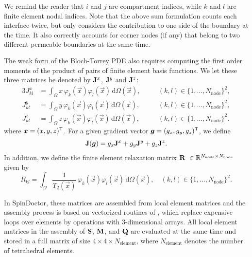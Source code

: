 \documentclass[a4paper]{article}
\begin{document}
We remind the reader that $i$ and $j$ are compartment indices, while $k$ and $l$ are finite element nodal indices. Note that the above sum formulation counts each interface twice, but only considers the contribution to one side of the boundary at the time. It also correctly accounts for corner nodes (if any) that belong to two different permeable boundaries at the same time.

The weak form of the Bloch-Torrey PDE also requires computing the first order moments of the product of pairs of finite element basis functions. We let these three matrices be denoted by $\mathbf{J}^x$, $\mathbf{J}^y$ and $\mathbf{J}^z$:
\begin{alignat}{3}
    J_{kl}^x & = \int_\Omega x \, \varphi_k(\vec{x}) \varphi_l(\vec{x}) \, \mathrm{d} \Omega(\vec{x}), \quad &  & (k, l) \in \{1, \dots, N_\text{node}\}^2, \\
    J_{kl}^y & = \int_\Omega y \, \varphi_k(\vec{x}) \varphi_l(\vec{x}) \, \mathrm{d} \Omega(\vec{x}), \quad &  & (k, l) \in \{1, \dots, N_\text{node}\}^2, \\
    J_{kl}^z & = \int_\Omega z \, \varphi_k(\vec{x}) \varphi_l(\vec{x}) \, \mathrm{d} \Omega(\vec{x}), \quad &  & (k, l) \in \{1, \dots, N_\text{node}\}^2.
\end{alignat}
where $\bm{x} = (x, y, z)^{\mathsf{T}}$. For a given gradient vector $\bm{g} = (g_x, g_y, g_z)^{\mathsf{T}}$, we define
\begin{equation}
    \mathbf{J}(\bm{g}) = g_x \mathbf{J}^x + g_y \mathbf{J}^y + g_z \mathbf{J}^z.
\end{equation}
In addition, we define the finite element relaxation matrix $\mat{R} \in \mathbb{R}^{N_\text{node} \times N_\text{node}}$ given by
\begin{equation}
    R_{kl} = \int_\Omega \frac{1}{T_2(\vec{x})} \, \varphi_k(\vec{x}) \varphi_l(\vec{x}) \, \mathrm{d} \Omega(\vec{x}), \quad (k, l) \in \{1, \dots, N_\text{node}\}^2.
\end{equation}

In SpinDoctor, these matrices are assembled from local element matrices and the assembly process is based on vectorized routines of \cite{RahmanValdman2013}, which replace expensive loops over elements by operations with 3-dimensional arrays. All local element matrices in the assembly of $\mathbf{S}$, $\mathbf{M}$, and $\mathbf{Q}$ are evaluated at the same time and stored in a full matrix of size $4 \times 4 \times N_\text{element}$, where $N_\text{element}$ denotes the number of tetrahedral elements.
\end{document}
